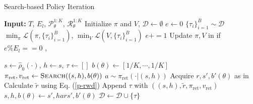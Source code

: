 
\begin{algorithm}[t]
  \caption{Search-based Policy Iteration}
  \label{alg:3}
  \begin{multicols}{2}
    \begin{algorithmic}
      \State \textbf{Input:} $T$, $E_l$, $\mathcal{P}_\theta^{1:K}$, $\mathcal{R}_\theta^{1:K}$
      \State
      \State Initialize $\pi$ and $V$, $\mathcal{D} \leftarrow \emptyset$
      \State $e \leftarrow 0$
            \State $\{\tau_i\}_{i=1}^{B} \sim \mathcal{D}$
            \State $\min_\pi \mathcal{L}(\pi, \{\tau_i\}_{i=1}^{B})$, $\min_V \mathcal{L}(V, \{\tau_i\}_{i=1}^{B})$
            \State $e \mathrel{{+}{=}} 1$
            \State Update $\pi, V$ in  if $e \% E_l == 0$
        \EndWhile
      \EndProcedure
      , 
      
    \end{algorithmic}
    \columnbreak
    \begin{algorithmic}
            \State $s \leftarrow \hat{\rho}_0(\cdot)$, $h \leftarrow s$, $\tau \leftarrow []$
            \State $b(\theta) \leftarrow [1/K, \cdots, 1/K]$
            \State $\pi_{\text{ret}}, v_{\text{ret}} \leftarrow \textproc{Search}((s, h), b(\theta))$
            \State $a \sim \pi_{\text{ret}}(\cdot|(s, h))$
            \State Acquire $r, s', b'(\theta)$ as in {\small {}}
            \State Calculate $\tilde{r}$ using Eq. (\ref{p-rwd})
            \State Append $\tau$ with $((s, h), \tilde{r}, \pi_{\text{ret}}, v_{\text{ret}})$
            \State $s, h, b(\theta) \leftarrow s', hars', b'(\theta)$
            \EndFor
            \State $\mathcal{D} \leftarrow \mathcal{D} \cup \{\tau\}$
        \EndWhile
      \EndProcedure
    \end{algorithmic}
  \end{multicols}
\end{algorithm}